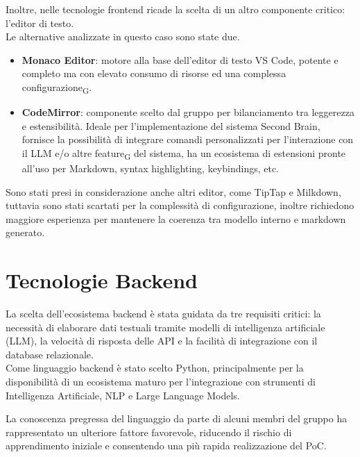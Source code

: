 Inoltre, nelle tecnologie frontend ricade la scelta di un altro componente critico: l’editor di testo. \\
Le alternative analizzate in questo caso sono state due.
\begin{itemize}
    \item \textbf{Monaco Editor}: motore alla base dell’editor di testo VS Code, potente e completo ma con elevato consumo di risorse ed una complessa configurazione\textsubscript{G}.
    \item \textbf{CodeMirror}: componente scelto dal gruppo per bilanciamento tra leggerezza e estensibilità. Ideale per l’implementazione del sistema Second Brain, fornisce la possibilità di integrare comandi personalizzati per l’interazione con il LLM e/o altre feature\textsubscript{G} del sistema, ha un ecosistema di estensioni pronte all’uso per Markdown, syntax highlighting, keybindings, etc.
\end{itemize}
Sono stati presi in considerazione anche altri editor, come TipTap e Milkdown, tuttavia sono stati scartati per la complessità di configurazione, inoltre richiedono maggiore esperienza per mantenere la coerenza tra modello interno e markdown generato.


\section{Tecnologie Backend}
La scelta dell’ecosistema backend è stata guidata da tre requisiti critici: la necessità di elaborare dati testuali tramite modelli di intelligenza artificiale (LLM), la velocità di risposta delle API e la facilità di integrazione con il database relazionale. \\

Come linguaggio backend è stato scelto Python, principalmente per la disponibilità di un
ecosistema maturo per l'integrazione con strumenti di Intelligenza Artificiale, NLP e Large
Language Models.

La conoscenza pregressa del linguaggio da parte di alcuni membri del gruppo ha rappresentato
un ulteriore fattore favorevole, riducendo il rischio di apprendimento iniziale e consentendo
una più rapida realizzazione del PoC.

